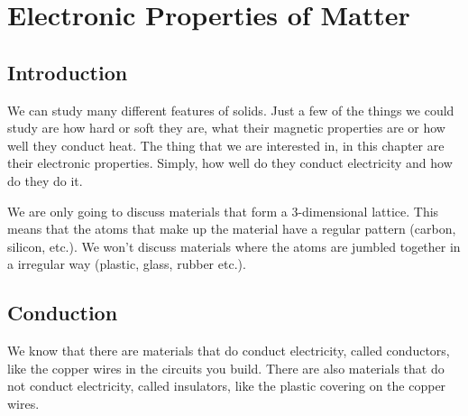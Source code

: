 \chapter{Electronic Properties of Matter}
\label{p:mm:ep11}

\section{Introduction}

We can study many different features of solids. Just a few of the things we could study are how hard or soft they are, what their magnetic properties are or how well they conduct heat. The thing that we are interested in, in this chapter are their electronic properties. Simply, how well do they conduct electricity and how do they do it.

We are only going to discuss materials that form a 3-dimensional lattice. This means that the atoms that make up the material have a regular pattern (carbon, silicon, etc.). We won't discuss materials where the atoms are jumbled together in a irregular way (plastic, glass, rubber etc.).\\
\section{Conduction}

We know that there are materials that do conduct electricity, called conductors, like the copper wires in the circuits you build. There are also materials that do not conduct electricity, called insulators, like the plastic covering on the copper wires.

